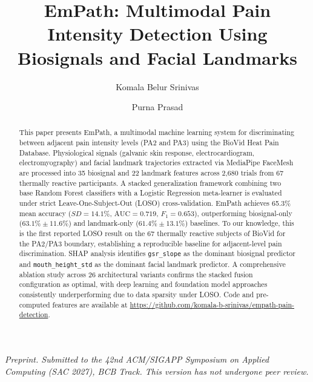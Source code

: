 \documentclass[sigconf]{acmart}
\author{Komala Belur Srinivas}
\affiliation{%
  \institution{Hofstra University}
  \department{Department of Computer Science}
  \city{Hempstead}
  \state{New York}
  \country{USA}
}
\author{Purna Prasad}
\affiliation{%
  \institution{Hofstra University}
  \department{Department of Computer Science}
  \city{Hempstead}
  \state{New York}
  \country{USA}
}
\begin{document}

\title{EmPath: Multimodal Pain Intensity Detection Using\\
       Biosignals and Facial Landmarks}

\begin{abstract}
This paper presents EmPath, a multimodal machine learning system for
discriminating between adjacent pain intensity levels (PA2 and PA3) using the
BioVid Heat Pain Database. Physiological signals (galvanic skin response,
electrocardiogram, electromyography) and facial landmark trajectories extracted
via MediaPipe FaceMesh are processed into 35 biosignal and 22 landmark features
across 2,680 trials from 67 thermally reactive participants. A stacked
generalization framework combining two base Random Forest classifiers with a
Logistic Regression meta-learner is evaluated under strict
Leave-One-Subject-Out (LOSO) cross-validation. EmPath achieves 65.3\% mean
accuracy ($SD = 14.1\%$, $\text{AUC} = 0.719$, $F_1 = 0.653$), outperforming
biosignal-only ($63.1\% \pm 11.6\%$) and landmark-only ($61.4\% \pm 13.1\%$)
baselines. To our knowledge, this is the first reported LOSO result on the 67
thermally reactive subjects of BioVid for the PA2/PA3 boundary, establishing a
reproducible baseline for adjacent-level pain discrimination. SHAP analysis
identifies \texttt{gsr\_slope} as the dominant biosignal predictor and
\texttt{mouth\_height\_std} as the dominant facial landmark predictor. A
comprehensive ablation study across 26 architectural variants confirms the
stacked fusion configuration as optimal, with deep learning and foundation
model approaches consistently underperforming due to data sparsity under LOSO.
Code and pre-computed features are available at
\url{https://github.com/komala-b-srinivas/empath-pain-detection}.
\end{abstract}

\maketitle

\begin{tcolorbox}[colback=gray!10,colframe=gray!50,boxrule=0.4pt,left=4pt,right=4pt,top=2pt,bottom=2pt]
  \small\textit{Preprint. Submitted to the 42nd ACM/SIGAPP Symposium on Applied Computing
  (SAC 2027), BCB Track. This version has not undergone peer review.}
\end{tcolorbox}
\vspace{4pt}
\end{document}
